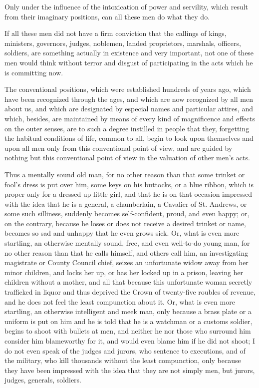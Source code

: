\documentclass{book}
\begin{document}
Only under the influence of the intoxication of power and servility, which result from their imaginary positions, can all these men do what they do.

If all these men did not have a firm conviction that the callings of kings, ministers, governors, judges, noblemen, landed proprietors, marshals, officers, soldiers, are something actually in existence and very important, not one of these men would think without terror and disgust of participating in the acts which he is committing now.

The conventional positions, which were established hundreds of years ago, which have been recognized through the ages, and which are now recognized by all men about us, and which are designated by especial names and particular attires, and which, besides, are maintained by means of every kind of magnificence and effects on the outer senses, are to such a degree instilled in people that they, forgetting the habitual conditions of life, common to all, begin to look upon themselves and upon all men only from this conventional point of view, and are guided by nothing but this conventional point of view in the valuation of other men’s acts.

Thus a mentally sound old man, for no other reason than that some trinket or fool’s dress is put over him, some keys on his buttocks, or a blue ribbon, which is proper only for a dressed-up little girl, and that he is on that occasion impressed with the idea that he is a general, a chamberlain, a Cavalier of St. Andrews, or some such silliness, suddenly becomes self-confident, proud, and even happy; or, on the contrary, because he loses or does not receive a desired trinket or name, becomes so sad and unhappy that he even grows sick. Or, what is even more startling, an otherwise mentally sound, free, and even well-to-do young man, for no other reason than that he calls himself, and others call him, an investigating magistrate or County Council chief, seizes an unfortunate widow away from her minor children, and locks her up, or has her locked up in a prison, leaving her children without a mother, and all that because this unfortunate woman secretly trafficked in liquor and thus deprived the Crown of twenty-five roubles of revenue, and he does not feel the least compunction about it. Or, what is even more startling, an otherwise intelligent and meek man, only because a brass plate or a uniform is put on him and he is told that he is a watchman or a customs soldier, begins to shoot with bullets at men, and neither he nor those who surround him consider him blameworthy for it, and would even blame him if he did not shoot; I do not even speak of the judges and jurors, who sentence to executions, and of the military, who kill thousands without the least compunction, only because they have been impressed with the idea that they are not simply men, but jurors, judges, generals, soldiers.
\end{document}
